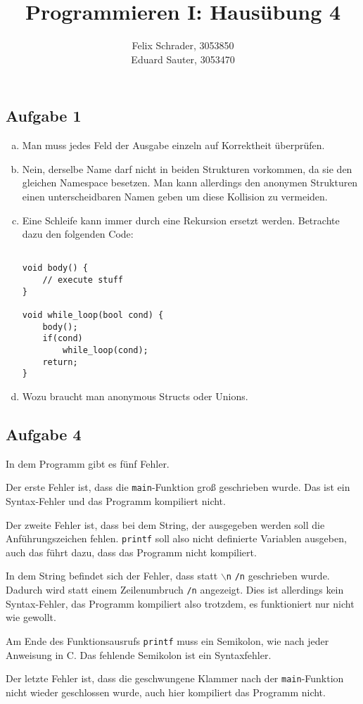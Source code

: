 \documentclass[11pt]{article}
\author{Felix Schrader, 3053850 \\
      Eduard Sauter, 3053470 }
\title{Programmieren I: Haus\"ubung 4}
\begin{document}
\maketitle
\subsection*{Aufgabe 1}
\begin{enumerate}[a)]
  \item Man muss jedes Feld der Ausgabe einzeln auf Korrektheit \"uberpr\"ufen.

  \item Nein, derselbe Name darf nicht in beiden Strukturen vorkommen, 
    da sie den gleichen Namespace besetzen. Man kann allerdings den
    anonymen Strukturen einen unterscheidbaren Namen geben um diese Kollision
    zu vermeiden.

  \item Eine Schleife kann immer durch eine Rekursion ersetzt werden. 
    Betrachte dazu den folgenden Code:
\begin{lstlisting}
  
void body() {
    // execute stuff
}

void while_loop(bool cond) {
    body();
    if(cond)
        while_loop(cond);
    return;
}
\end{lstlisting}
  \item
    Wozu braucht man anonymous Structs oder Unions.
    
\end{enumerate} 

\subsection*{Aufgabe 4}
In dem Programm gibt es fünf Fehler.

Der erste Fehler ist, dass die \texttt{main}-Funktion groß geschrieben wurde.
Das ist ein Syntax-Fehler und das Programm kompiliert nicht.

Der zweite Fehler ist, dass bei dem String, der ausgegeben werden soll die
Anführungszeichen fehlen. \texttt{printf} soll also nicht definierte Variablen
ausgeben, auch das führt dazu, dass das Programm nicht kompiliert.

In dem String befindet sich der Fehler, dass statt \texttt{$\backslash$n}
\texttt{/n} geschrieben wurde. Dadurch wird statt einem Zeilenumbruch
\texttt{/n} angezeigt. Dies ist allerdings kein Syntax-Fehler, das Programm
kompiliert also trotzdem, es funktioniert nur nicht wie gewollt.

Am Ende des Funktionsausrufs \texttt{printf} muss ein Semikolon, wie nach jeder
Anweisung in C. Das fehlende Semikolon ist ein Syntaxfehler.

Der letzte Fehler ist, dass die geschwungene Klammer nach der
\texttt{main}-Funktion nicht wieder geschlossen wurde, auch hier kompiliert das
Programm nicht.
\end{document}
